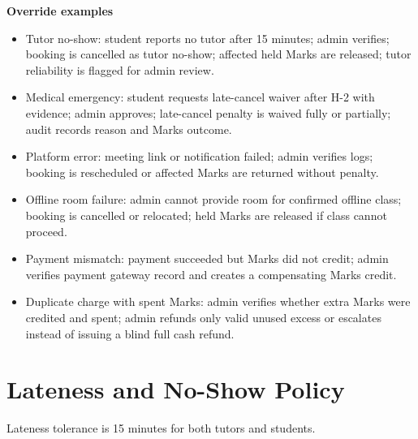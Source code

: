 \documentclass[11pt,a4paper]{article}
\begin{document}
\textbf{Override examples}
\begin{itemize}
    \item Tutor no-show: student reports no tutor after 15 minutes; admin verifies; booking is cancelled as tutor no-show; affected held Marks are released; tutor reliability is flagged for admin review.
    \item Medical emergency: student requests late-cancel waiver after H-2 with evidence; admin approves; late-cancel penalty is waived fully or partially; audit records reason and Marks outcome.
    \item Platform error: meeting link or notification failed; admin verifies logs; booking is rescheduled or affected Marks are returned without penalty.
    \item Offline room failure: admin cannot provide room for confirmed offline class; booking is cancelled or relocated; held Marks are released if class cannot proceed.
    \item Payment mismatch: payment succeeded but Marks did not credit; admin verifies payment gateway record and creates a compensating Marks credit.
    \item Duplicate charge with spent Marks: admin verifies whether extra Marks were credited and spent; admin refunds only valid unused excess or escalates instead of issuing a blind full cash refund.
\end{itemize}

\section{Lateness and No-Show Policy}

Lateness tolerance is 15 minutes for both tutors and students.
\end{document}
